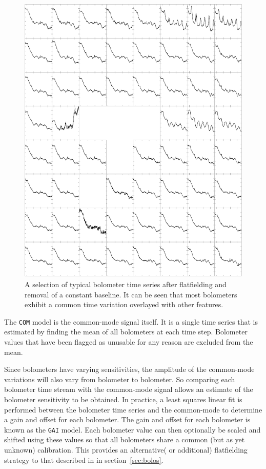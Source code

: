 \documentclass[useAMS,usenatbib,nofootinbib]{mn2e}
\newcommand{\model}[1]{\texttt{#1}}
\begin{document}
\begin{figure}
\centering
\includegraphics[width=\linewidth]{com.pdf}
\caption{A selection of typical bolometer time series after flatfielding
and removal of a constant baseline. It can be seen that most bolometers
exhibit a common time variation overlayed with other features.}
\label{fig:com}
\end{figure}

The \model{COM} model is the common-mode signal itself. It is a single time
series that is estimated by finding the mean of all bolometers at each
time step. Bolometer values that have been flagged as unusable for any
reason are excluded from the mean.

Since bolometers have varying sensitivities, the amplitude of the
common-mode variations will also vary from bolometer to bolometer. So
comparing each bolometer time stream with the common-mode signal
allows an estimate of the bolometer sensitivity to be obtained. In
practice, a least squares linear fit is performed between the
bolometer time series and the common-mode to determine a gain and
offset for each bolometer.  The gain and offset for each bolometer is
known as the \model{GAI} model. Each bolometer value can then
optionally be scaled and shifted using these values so that all
bolometers share a common (but as yet unknown) calibration. This
provides an alternative( or additional) flatfielding strategy to that
described in in section~\ref{sec:bolos}.
\end{document}
